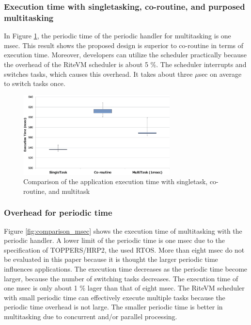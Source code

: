 \documentclass{sig-alternate-05-2015}
\begin{document}
\subsubsection{Execution time with singletasking, co-routine, and purposed multitasking}
In Figure \ref{fig:comparison_s_c_m}, the periodic time of the periodic handler for multitasking is one msec.
This result shows the proposed design is superior to co-routine in terms of execution time.
Moreover, developers can utilize the scheduler practically because the overhead of the RiteVM scheduler is about 5 \%.
The scheduler interrupts and switches tasks, which causes this overhead.
It takes about three $\mu$sec on average to switch tasks once.

\begin{figure}[t]
    \centering
    \includegraphics[width=8cm,clip]{figure/comparison_s_c_m.eps}
    \vspace{1mm}
\caption{Comparison of the application execution time with singletask, co-routine, and multitask}
    \vspace{1mm}
\label{fig:comparison_s_c_m}
\end{figure}

\subsubsection{Overhead for periodic time}
Figure \ref{fig:comparison_msec} shows the execution time of multitasking with the periodic handler.
A lower limit of the periodic time is one msec due to the specification of TOPPERS/HRP2, the used RTOS.
More than eight msec do not be evaluated in this paper because it is thought the larger periodic time influences applications.
The execution time decreases as the periodic time become larger, because the number of switching tasks decreases.
The execution time of one msec is only about 1 \% lager than that of eight msec.
The RiteVM scheduler with small periodic time can effectively execute multiple tasks because the periodic time overhead is not large.
The smaller periodic time is better in multitasking due to concurrent and/or parallel processing.
\end{document}

